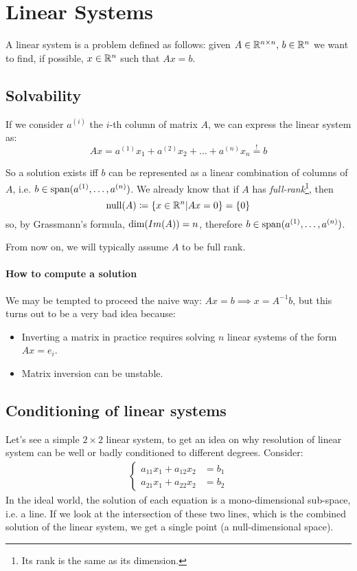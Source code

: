 \section{Linear Systems}
A linear system is a problem defined as follows: given $A \in \mathbb{R}^{n \times n},\,b \in \mathbb{R}^n$ we want to find, if possible, $x \in \mathbb{R}^n$ such that $Ax = b$.

\subsection{Solvability}
If we consider $a^{(i)}$ the $i$-th column of matrix $A$, we can express the linear system as:
\begin{dmath*}
	Ax = a^{(1)}x_1 + a^{(2)}x_2 + \ldots + a^{(n)}x_n \stackrel{!}{=} b
\end{dmath*}

So a solution exists iff $b$ can be represented as a linear combination of columns of $A$, i.e. $b \in \operatorname{span}(a^{(1)},\ldots,a^{(n)})$.
We already know that if $A$ has \emph{full-rank}\footnote{Its rank is the same as its dimension.}, then
\begin{equation*}
	\operatorname{null}(A) \coloneqq \{ x \in \mathbb{R}^n | Ax = 0 \} = \{0\}
\end{equation*}
so, by Grassmann's formula, $\operatorname{dim}(Im(A)) = n$, therefore $b \in \operatorname{span}(a^{(1)},\ldots,a^{(n)})$.

From now on, we will typically assume $A$ to be full rank.

\paragraph{How to compute a solution}
We may be tempted to proceed the naive way: $Ax = b \implies x = A^{-1}b$, but this turns out to be a very bad idea because:
\begin{itemize}
	\item Inverting a matrix in practice requires solving $n$ linear systems of the form $Ax = e_i$.
	\item Matrix inversion can be unstable.
\end{itemize}

\subsection{Conditioning of linear systems}
Let's see a simple $2 \times 2$ linear system, to get an idea on why resolution of linear system can be well or badly conditioned to different degrees. Consider:
\begin{align*}
	\begin{cases}
		a_{11} x_1 + a_{12} x_2 &= b_1 \\
		a_{21} x_1 + a_{22} x_2 &= b_2
	\end{cases}
\end{align*}
In the ideal world, the solution of each equation is a mono-dimensional sub-space, i.e. a line. If we look at the intersection of these two lines, which is the combined solution of the linear system, we get a single point (a null-dimensional space).

